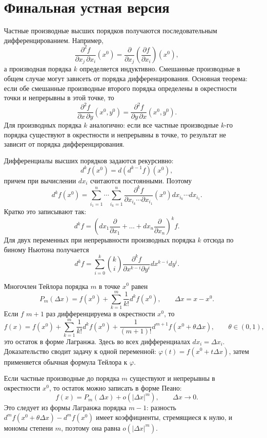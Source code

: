 \documentclass[12pt,a4paper]{article}
\newcommand{\Dx}{\Delta x}
\begin{document}
\section*{Финальная устная версия}

Частные производные высших порядков получаются последовательным
дифференцированием. Например,
\[
  \frac{\partial^2 f}{\partial x_j\,\partial x_i}(x^0)
  =
  \frac{\partial}{\partial x_j}
  \left(\frac{\partial f}{\partial x_i}\right)(x^0),
\]
а производная порядка \(k\) определяется индуктивно. Смешанные производные в
общем случае могут зависеть от порядка дифференцирования. Основная теорема:
если обе смешанные производные второго порядка определены в окрестности точки
и непрерывны в этой точке, то
\[
  \frac{\partial^2 f}{\partial x\,\partial y}(x^0,y^0)
  =
  \frac{\partial^2 f}{\partial y\,\partial x}(x^0,y^0).
\]
Для производных порядка \(k\) аналогично: если все частные производные
\(k\)-го порядка существуют в окрестности и непрерывны в точке, то результат
не зависит от порядка дифференцирования.

Дифференциалы высших порядков задаются рекурсивно:
\[
  d^k f(x^0)=d(d^{k-1}f)(x^0),
\]
причем при вычислении \(dx_i\) считаются постоянными. Поэтому
\[
  d^k f(x^0)
  =
  \sum_{i_1=1}^n\cdots\sum_{i_k=1}^n
  \frac{\partial^k f}
       {\partial x_{i_k}\cdots\partial x_{i_1}}(x^0)
  dx_{i_k}\cdots dx_{i_1}.
\]
Кратко это записывают так:
\[
  d^k f=
  \left(
    dx_1\frac{\partial}{\partial x_1}
    +\dots+
    dx_n\frac{\partial}{\partial x_n}
  \right)^k f.
\]
Для двух переменных при непрерывности производных порядка \(k\) отсюда по
биному Ньютона получается
\[
  d^k f=
  \sum_{i=0}^k
  \binom{k}{i}
  \frac{\partial^k f}{\partial x^{k-i}\partial y^i}
  dx^{k-i}dy^i.
\]

Многочлен Тейлора порядка \(m\) в точке \(x^0\) равен
\[
  P_m(\Dx)=f(x^0)+\sum_{k=1}^m\frac{1}{k!}d^k f(x^0),
  \qquad \Dx=x-x^0.
\]
Если \(f\) \(m+1\) раз дифференцируема в окрестности \(x^0\), то
\[
  f(x)
  =
  f(x^0)
  +\sum_{k=1}^m\frac{1}{k!}d^k f(x^0)
  +\frac{1}{(m+1)!}d^{m+1}f(x^0+\theta\Dx),
  \qquad \theta\in(0,1),
\]
это остаток в форме Лагранжа. Здесь во всех дифференциалах
\(dx_i=\Delta x_i\). Доказательство сводит задачу к одной переменной:
\(\varphi(t)=f(x^0+t\Dx)\), затем применяется обычная формула Тейлора к
\(\varphi\).

Если частные производные до порядка \(m\) существуют и непрерывны в
окрестности \(x^0\), то остаток можно записать в форме Пеано:
\[
  f(x)=P_m(\Dx)+o(|\Dx|^m),\qquad \Dx\to0.
\]
Это следует из формы Лагранжа порядка \(m-1\): разность
\(d^m f(x^0+\theta\Dx)-d^m f(x^0)\) имеет коэффициенты, стремящиеся к нулю, и
мономы степени \(m\), поэтому она равна \(o(|\Dx|^m)\).
\end{document}
